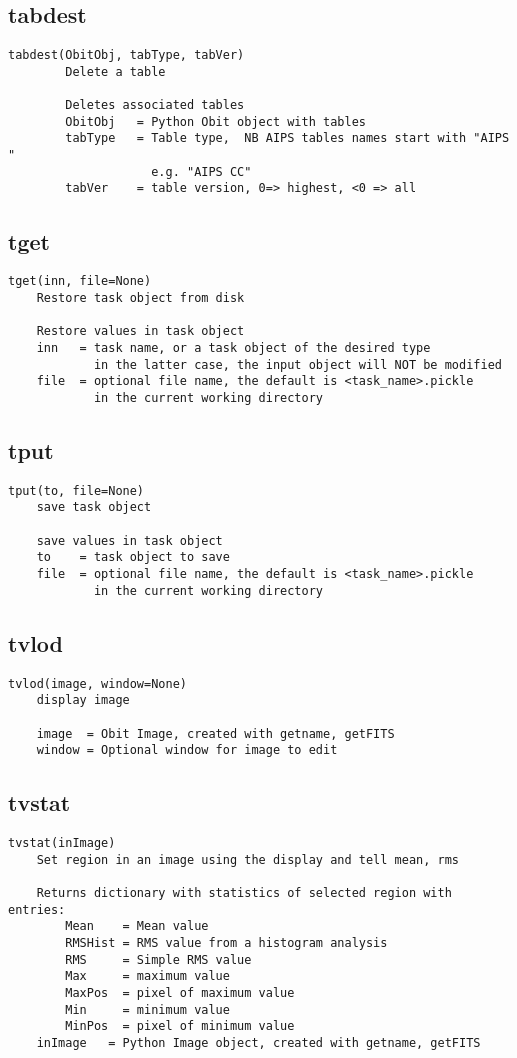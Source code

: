 \documentclass[11pt]{report}
\begin{document}
\subsection{tabdest}
\begin{verbatim}
tabdest(ObitObj, tabType, tabVer)
        Delete a table
        
        Deletes associated tables
        ObitObj   = Python Obit object with tables
        tabType   = Table type,  NB AIPS tables names start with "AIPS "
                    e.g. "AIPS CC"
        tabVer    = table version, 0=> highest, <0 => all
\end{verbatim}
    
\subsection{tget}
\begin{verbatim}
tget(inn, file=None)
    Restore task object from disk
    
    Restore values in task object
    inn   = task name, or a task object of the desired type
            in the latter case, the input object will NOT be modified
    file  = optional file name, the default is <task_name>.pickle
            in the current working directory
\end{verbatim}

\subsection{tput}
\begin{verbatim}
tput(to, file=None)
    save task object
    
    save values in task object
    to    = task object to save
    file  = optional file name, the default is <task_name>.pickle
            in the current working directory
\end{verbatim}

\subsection{tvlod}
\begin{verbatim}
tvlod(image, window=None)
    display image
    
    image  = Obit Image, created with getname, getFITS
    window = Optional window for image to edit
\end{verbatim}

\subsection{tvstat}
\begin{verbatim}
tvstat(inImage)
    Set region in an image using the display and tell mean, rms
    
    Returns dictionary with statistics of selected region with entries:
        Mean    = Mean value
        RMSHist = RMS value from a histogram analysis
        RMS     = Simple RMS value
        Max     = maximum value
        MaxPos  = pixel of maximum value
        Min     = minimum value
        MinPos  = pixel of minimum value
    inImage   = Python Image object, created with getname, getFITS
\end{verbatim}
\end{document}
